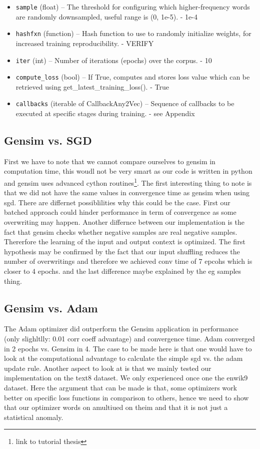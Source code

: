 \begin{itemize}
 \item   \texttt{sample} (float) – The threshold for configuring which higher-frequency words are randomly downsampled, useful range is (0, 1e-5). - 1e-4
   \item \texttt{hashfxn} (function) – Hash function to use to randomly initialize weights, for increased training reproducibility. - VERIFY 
  \item  \texttt{iter} (int) – Number of iterations (epochs) over the corpus. - 10 
 \
  \item  \texttt{compute\_loss} (bool) – If True, computes and stores loss value which can be retrieved using get\_latest\_training\_loss(). - True
 \item   \texttt{callbacks} (iterable of CallbackAny2Vec) – Sequence of callbacks to be executed at specific stages during training. - see Appendix
\end{itemize}

\subsection{Gensim vs. SGD}
First we have to note that we cannot compare ourselves to gensim in computation time, this woudl not be very smart as our code is written in python and gensim uses advanced cython routines\footnote{link to tutorial thesis}. 
The first interesting thing to note is that we did not have the same values in convergence time as gensim when using sgd. There are differnet possiblilities why this could be the case. First our batched approach could hinder performance in term of convergence as some overwriting may happen. Another differnce between our implementation is the fact that gensim checks whether negative samples are real negative samples. Thererfore the learning of the input and output context is optimized. 
The first hypothesis may be confirmed by the fact that our input shuffling reduces the number of overwritings and therefore we achieved conv time of 7 epcohs which is closer to 4 epochs. and the last difference maybe explained by the eg samples thing. 

\subsection{Gensim vs. Adam}
The Adam optimizer did outperform the Gensim application in performance (only slighltlly: 0.01 corr coeff advantage) and convergence time. Adam converged in 2 epochs vs. Gensim in 4. The case to be made here is that one would have to look at the computational advantage to calculate the simple sgd vs.  the adam update rule. Another aspect to look at is that we mainly tested our implementation on the text8 dataset. We only experienced once one the enwik9 dataset. Here the argument that can be made is that, some optimizers work better on specific loss functions in comparison to others, hence we need to show that our optimizer words on amultiued on theim and that it is not just a statistical anomaly.
